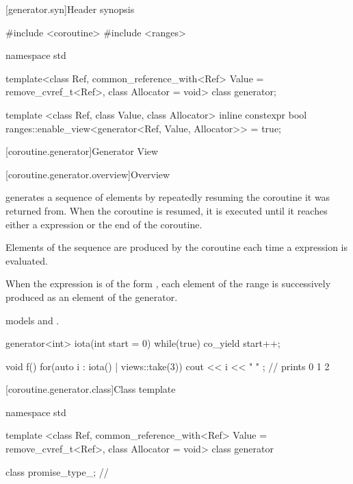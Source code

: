 \documentclass{wg21}
\begin{document}
\begin{addedblock}
[generator.syn]{Header  synopsis}


\begin{codeblock}

#include <coroutine>
#include <ranges>

namespace std {

    template<class Ref,
        common_reference_with<Ref> Value = remove_cvref_t<Ref>,
        class Allocator = void>
    class generator;

    template <class Ref, class Value, class Allocator>
    inline constexpr bool ranges::enable_view<generator<Ref, Value, Allocator>> = true;
}

\end{codeblock}


[coroutine.generator]{Generator View}

[coroutine.generator.overview]{Overview}


 generates a sequence of elements by repeatedly resuming the coroutine it was returned from.
When the coroutine is resumed, it is executed until it reaches either a  expression or the end of the coroutine.

Elements of the sequence are produced by the coroutine each time a  expression is evaluated.

When the  expression is of the form , each element of the range  is successively produced
as an element of the generator.

 models  and .


\begin{example}
    \begin{codeblock}
        generator<int> iota(int start = 0) {
            while(true)
                co_yield start++;
        }

        void f() {
            for(auto i : iota() | views::take(3))
            cout << i << " " ; // prints 0 1 2
        }

    \end{codeblock}
\end{example}


[coroutine.generator.class]{Class template }

\begin{codeblock}

namespace std {

template <class Ref, common_reference_with<Ref> Value = remove_cvref_t<Ref>,
          class Allocator = void>
class generator  {
    class promise_type_; // \expos

}}
\end{codeblock}
\end{addedblock}
\end{document}
